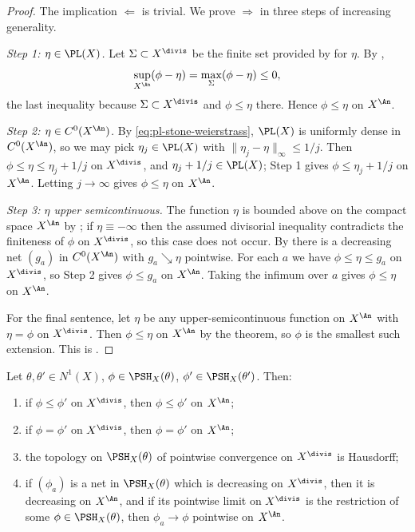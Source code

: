 \begin{proof}
The implication $\Leftarrow$ is trivial.  We prove $\Rightarrow$ in
three steps of increasing generality.

\emph{Step 1: $\eta\in\PL(X)$.}  Let $\Sigma\subset X^{\divis}$ be the
finite set provided by  for $\eta$.  By
,
\[
 \sup_{X^{\An}}(\phi-\eta)=\max_\Sigma(\phi-\eta)\leq0,
\]
the last inequality because $\Sigma\subset X^{\divis}$ and
$\phi\leq\eta$ there.  Hence $\phi\leq\eta$ on $X^{\An}$.

\emph{Step 2: $\eta\in C^0(X^{\An})$.}  By
\eqref{eq:pl-stone-weierstrass}, $\PL(X)$ is uniformly dense in
$C^0(X^{\An})$, so we may pick
$\eta_j\in\PL(X)$ with $\|\eta_j-\eta\|_\infty\leq1/j$.  Then
$\phi\leq\eta\leq\eta_j+1/j$ on $X^{\divis}$, and
$\eta_j+1/j\in\PL(X)$; Step 1 gives
$\phi\leq\eta_j+1/j$ on $X^{\An}$.  Letting $j\to\infty$ gives
$\phi\leq\eta$ on $X^{\An}$.

\emph{Step 3: $\eta$ upper semicontinuous.}  The function $\eta$ is
bounded above on the compact space $X^{\An}$ by
; if $\eta\equiv-\infty$ then
the assumed divisorial inequality contradicts the finiteness of $\phi$ on
$X^{\divis}$, so this case does not occur.  By
 there is a decreasing net
$(g_a)$ in $C^0(X^{\An})$ with $g_a\searrow\eta$ pointwise.  For each
$a$ we have $\phi\leq\eta\leq g_a$ on $X^{\divis}$, so Step 2 gives
$\phi\leq g_a$ on $X^{\An}$.  Taking the infimum over $a$ gives
$\phi\leq\eta$ on $X^{\An}$.

For the final sentence, let $\eta$ be any upper-semicontinuous function on
$X^{\An}$ with $\eta=\phi$ on $X^{\divis}$.  Then
$\phi\leq\eta$ on $X^{\An}$ by the theorem, so $\phi$ is the smallest
such extension.  This is \cite[Theorem~4.22]{BJ22}.
\end{proof}

\begin{corollary}
\label{cor:ch35-divisorial-determination}
Let $\theta,\theta'\in N^1(X)$, $\phi\in\PSH_X(\theta)$,
$\phi'\in\PSH_X(\theta')$.  Then:
\begin{enumerate}
\item if $\phi\leq\phi'$ on $X^{\divis}$, then $\phi\leq\phi'$ on
 $X^{\An}$;
\item if $\phi=\phi'$ on $X^{\divis}$, then $\phi=\phi'$ on
 $X^{\An}$;
\item the topology on $\PSH_X(\theta)$ of pointwise convergence on
 $X^{\divis}$ is Hausdorff;
\item if $(\phi_a)$ is a net in $\PSH_X(\theta)$ which is decreasing on
 $X^{\divis}$, then it is decreasing on $X^{\An}$, and if its pointwise
 limit on $X^{\divis}$ is the restriction of some
 $\phi\in\PSH_X(\theta)$, then $\phi_a\to\phi$ pointwise on
 $X^{\An}$.
\end{enumerate}
\par
\end{corollary}

